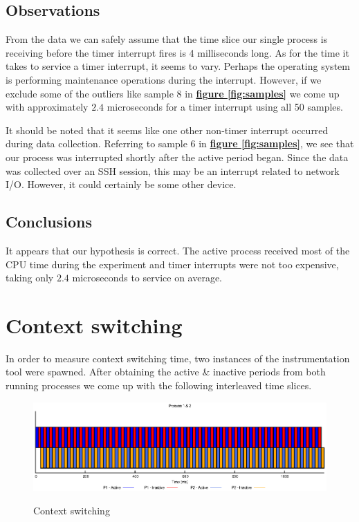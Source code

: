 \documentclass[oneside]{amsart}
\theoremstyle{definition}
\theoremstyle{remark}
\numberwithin{equation}{section}
\begin{document}
\subsection{Observations}
From the data we can safely assume that the time slice our single process is receiving before the
timer interrupt fires is 4 milliseconds long. As for the time it takes to service a timer interrupt,
it seems to vary. Perhaps the operating system is performing maintenance operations during the
interrupt. However, if we exclude some of the outliers like sample 8 in
\hyperref[fig:samples]{\textbf{figure \ref*{fig:samples}}} we come up with approximately $2.4$
microseconds for a timer interrupt using all 50 samples.

It should be noted that it seems like one other non-timer interrupt occurred during data collection.
Referring to sample 6 in \hyperref[fig:samples]{\textbf{figure \ref*{fig:samples}}}, we see that our
process was interrupted shortly after the active period began. Since the data was collected over an
SSH session, this may be an interrupt related to network I/O. However, it could certainly be some
other device.

\subsection{Conclusions}
It appears that our hypothesis is correct. The active process received most of the CPU time during
the experiment and timer interrupts were not too expensive, taking only $2.4$ microseconds to
service on average. \\

\newpage

\section{Context switching}
In order to measure context switching time, two instances of the instrumentation tool were spawned.
After obtaining the active \& inactive periods from both running processes we come up with the
following interleaved time slices.

\begin{figure}[h]
    \caption{Context switching}
    \centering
    \includegraphics[scale=1]{A1P2.eps}
    \label{fig:plot}
\end{figure}
\end{document}
